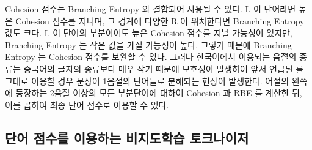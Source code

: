\documentclass[oneside, ko,phd]{snuthesis_utf8_kor}
\begin{document}
\begin{table}[ht]
\centering
\caption{Cohesion 점수와 Branching Entropy 예시}
\label{tab:cohesion_demo}
\end{table}

Cohesion 점수는 Branching Entropy 와 결합되어 사용될 수 있다.
L 이 단어라면 높은 Cohesion 점수를 지니며, 그 경계에 다양한 R 이 위치한다면 Branching Entropy 값도 크다.
L 이 단어의 부분이어도 높은 Cohesion 점수를 지닐 가능성이 있지만, Branching Entropy 는 작은 값을 가질 가능성이 높다.
그렇기 때문에 Branching Entropy 는 Cohesion 점수를 보완할 수 있다.
그러나 한국어에서 이용되는 음절의 종류는 중국어의 글자의 종류보다 매우 작기 때문에 모호성이 발생하여 앞서 언급된 \cite{zhao2008exploiting, feng2004unsupervised} 를 그대로 이용할 경우 문장이 1음절의 단어들로 분해되는 현상이 발생한다.
어절의 왼쪽에 등장하는 2음절 이상의 모든 부분단어에 대하여 Cohesion 과 RBE 를 계산한 뒤, 이를 곱하여 최종 단어 점수로 이용할 수 있다.

\subsection{단어 점수를 이용하는 비지도학습 토크나이저}
\end{document}
